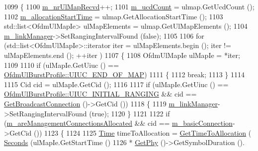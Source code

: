 \begin{DoxyCode}
1099 \{
1100   \hyperlink{classns3_1_1SubscriberStationNetDevice_a4c70541a7463928920f717898b165ce2}{m\_nrUlMapRecvd}++;
1101   \hyperlink{classns3_1_1SubscriberStationNetDevice_a0adf7470dd476619c9c5298bb52e9a32}{m\_ucdCount} = ulmap.GetUcdCount ();
1102   \hyperlink{classns3_1_1SubscriberStationNetDevice_a2cb4adc0ed8b698b828e86b8575fb9ee}{m\_allocationStartTime} = ulmap.GetAllocationStartTime ();
1103   std::list<OfdmUlMapIe> ulMapElements = ulmap.GetUlMapElements ();
1104   \hyperlink{classns3_1_1SubscriberStationNetDevice_a24e7df59fb312c196318f0366b63c6e6}{m\_linkManager}->SetRangingIntervalFound (\textcolor{keyword}{false});
1105 
1106   \textcolor{keywordflow}{for} (std::list<OfdmUlMapIe>::iterator iter = ulMapElements.begin (); iter != ulMapElements.end (); ++iter
      )
1107     \{
1108       OfdmUlMapIe ulMapIe = *iter;
1109 
1110       \textcolor{keywordflow}{if} (ulMapIe.GetUiuc () == \hyperlink{classns3_1_1OfdmUlBurstProfile_ae528783c4b3c6700ff49dfd7a555cb3dabef491e8d426af16beba1541b947b7e9}{OfdmUlBurstProfile::UIUC\_END\_OF\_MAP})
1111         \{
1112           \textcolor{keywordflow}{break};
1113         \}
1114 
1115       Cid cid = ulMapIe.GetCid ();
1116 
1117       \textcolor{keywordflow}{if} (ulMapIe.GetUiuc () == \hyperlink{classns3_1_1OfdmUlBurstProfile_ae528783c4b3c6700ff49dfd7a555cb3daaea7b6256d4bcd0125f0248c0560c94e}{OfdmUlBurstProfile::UIUC\_INITIAL\_RANGING}
       && cid == \hyperlink{classns3_1_1WimaxNetDevice_a11d2c7bbd695e2c845a821ec15baa2aa}{GetBroadcastConnection} ()->GetCid ())
1118         \{
1119           \hyperlink{classns3_1_1SubscriberStationNetDevice_a24e7df59fb312c196318f0366b63c6e6}{m\_linkManager}->SetRangingIntervalFound (\textcolor{keyword}{true});
1120         \}
1121 
1122       \textcolor{keywordflow}{if} (\hyperlink{classns3_1_1SubscriberStationNetDevice_a601bcf0cd57f6d9f0b112e9c9afc23e7}{m\_areManagementConnectionsAllocated} && cid == 
      \hyperlink{classns3_1_1SubscriberStationNetDevice_ae166a9acaa0e8d720a106491ba9ea2fc}{m\_basicConnection}->GetCid ())
1123         \{
1124 
1125           \hyperlink{namespacens3_1_1TracedValueCallback_a7ffd3e7c142ffe7c8a1d2db9b8de38ec}{Time} timeToAllocation = \hyperlink{classns3_1_1SubscriberStationNetDevice_aa487cd0f2d3291d23a4ccdcce0b80801}{GetTimeToAllocation} (
      \hyperlink{group__timecivil_ga33c34b816f8ff6628e33d5c8e9713b9e}{Seconds} (ulMapIe.GetStartTime ()
1126                                                                 * \hyperlink{classns3_1_1WimaxNetDevice_a81c1f9d43acfc9cd5d642b784102a21f}{GetPhy} ()->GetSymbolDuration ().

\end{DoxyCode}
